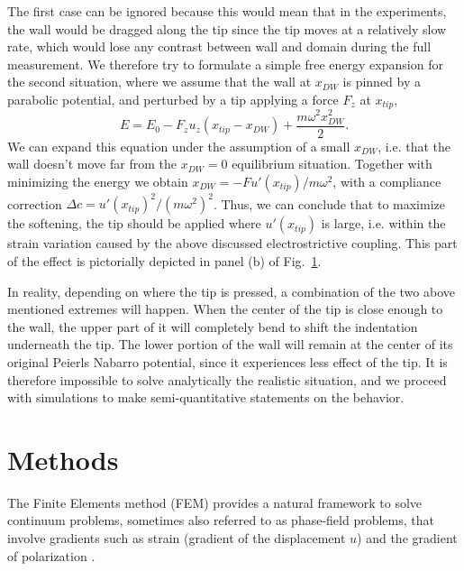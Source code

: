 The first case can be ignored because this would mean that in the experiments, the wall would be dragged along the tip since the tip moves at a relatively slow rate, which would lose any contrast between wall and domain during the full measurement.
We therefore try to formulate a simple free energy expansion for the second situation, where we assume that the wall at $x_{DW}$ is pinned by a parabolic potential, and perturbed by a tip applying a force $F_z$ at $x_{tip}$,
\begin{equation}
	E = E_0 - F_z u_z (x_{tip} - x_{DW}) + \frac{m\omega^2 x_{DW}^2}{2}.
\end{equation}
We can expand this equation under the assumption of a small $x_{DW}$, i.e. that the wall doesn't move far from the $x_{DW}=0$ equilibrium situation. Together with minimizing the energy we obtain $x_{DW} = -F u'(x_{tip})/m \omega^2$, with a compliance correction $\Delta c = u'(x_{tip})^2/(m\omega^2)^2$. Thus, we can conclude that to maximize the softening, the tip should be applied where $u'(x_{tip})$ is large, i.e. within the strain variation caused by the above discussed electrostrictive coupling. This part of the effect is pictorially depicted in panel (b) of Fig.~\ref{fig:BTO_theory}.

\begin{figure}
	\caption{\label{fig:BTO_theory}}
\end{figure}

In reality, depending on where the tip is pressed, a combination of the two above mentioned extremes will happen.
When the center of the tip is close enough to the wall, the upper part of it will completely bend to shift the indentation underneath the tip.
The lower portion of the wall will remain at the center of its original Peierls Nabarro potential, since it experiences less effect of the tip.
It is therefore impossible to solve analytically the realistic situation, and we proceed with simulations to make semi-quantitative statements on the behavior.

\section{Methods}
The Finite Elements method (FEM) provides a natural framework to solve continuum problems, sometimes also referred to as phase-field problems, that involve gradients such as strain (gradient of the displacement $u$) and the gradient of polarization \cite{Biner}.

